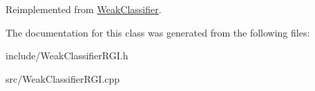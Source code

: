 Reimplemented from \hyperlink{classWeakClassifier_ad4c967e2f0d186a841722f8fea9dbd9c}{Weak\+Classifier}.



The documentation for this class was generated from the following files\+:\begin{DoxyCompactItemize}
\item 
include/Weak\+Classifier\+R\+G\+I.\+h\item 
src/Weak\+Classifier\+R\+G\+I.\+cpp\end{DoxyCompactItemize}
